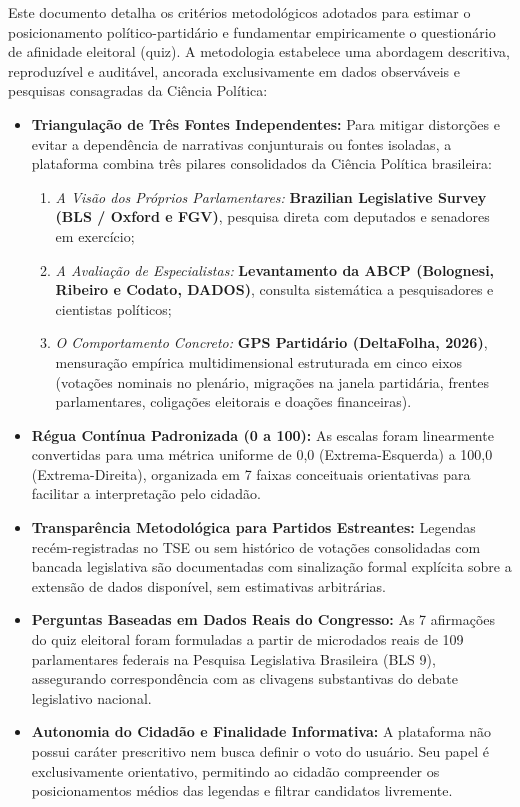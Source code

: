 \documentclass[10pt,a4paper]{article}
\begin{document}
\begin{tcolorbox}[editorialbox, title={\bfseries\large Resumo Executivo}]
Este documento detalha os critérios metodológicos adotados para estimar o posicionamento político-partidário e fundamentar empiricamente o questionário de afinidade eleitoral (quiz). A metodologia estabelece uma abordagem descritiva, reproduzível e auditável, ancorada exclusivamente em dados observáveis e pesquisas consagradas da Ciência Política:

\begin{itemize}\setlength{\itemsep}{0.25em}
    \item \textbf{Triangulação de Três Fontes Independentes:} Para mitigar distorções e evitar a dependência de narrativas conjunturais ou fontes isoladas, a plataforma combina três pilares consolidados da Ciência Política brasileira:
    \begin{enumerate}\setlength{\itemsep}{0.15em}
        \item \textit{A Visão dos Próprios Parlamentares:} \textbf{Brazilian Legislative Survey (BLS / Oxford e FGV)}, pesquisa direta com deputados e senadores em exercício;
        \item \textit{A Avaliação de Especialistas:} \textbf{Levantamento da ABCP (Bolognesi, Ribeiro e Codato, DADOS)}, consulta sistemática a pesquisadores e cientistas políticos;
        \item \textit{O Comportamento Concreto:} \textbf{GPS Partidário (DeltaFolha, 2026)}, mensuração empírica multidimensional estruturada em cinco eixos (votações nominais no plenário, migrações na janela partidária, frentes parlamentares, coligações eleitorais e doações financeiras).
    \end{enumerate}
    \item \textbf{Régua Contínua Padronizada (0 a 100):} As escalas foram linearmente convertidas para uma métrica uniforme de 0,0 (Extrema-Esquerda) a 100,0 (Extrema-Direita), organizada em 7 faixas conceituais orientativas para facilitar a interpretação pelo cidadão.
    \item \textbf{Transparência Metodológica para Partidos Estreantes:} Legendas recém-registradas no TSE ou sem histórico de votações consolidadas com bancada legislativa são documentadas com sinalização formal explícita sobre a extensão de dados disponível, sem estimativas arbitrárias.
    \item \textbf{Perguntas Baseadas em Dados Reais do Congresso:} As 7 afirmações do quiz eleitoral foram formuladas a partir de microdados reais de 109 parlamentares federais na Pesquisa Legislativa Brasileira (BLS 9), assegurando correspondência com as clivagens substantivas do debate legislativo nacional.
    \item \textbf{Autonomia do Cidadão e Finalidade Informativa:} A plataforma não possui caráter prescritivo nem busca definir o voto do usuário. Seu papel é exclusivamente orientativo, permitindo ao cidadão compreender os posicionamentos médios das legendas e filtrar candidatos livremente.
\end{itemize}
\end{tcolorbox}
\end{document}
